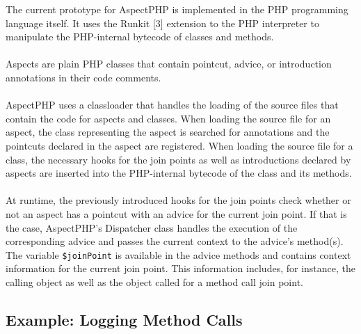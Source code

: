 \documentclass[portrait,a0]{a0poster}
\begin{document}
\begin{poster}
\begin{pcolumn}
\begin{pbox}
      The current prototype for AspectPHP is implemented in the PHP programming
      language itself. It uses the Runkit [3] extension to the PHP interpreter to
      manipulate the PHP-internal bytecode of classes and methods.\\
      \\
      Aspects are plain PHP classes that contain pointcut, advice, or
      introduction annotations in their code comments.\\
      \\
      AspectPHP uses a classloader that handles the loading of the source
      files that contain the code for aspects and classes.
      When loading the source file for an aspect, the class representing the
      aspect is searched for annotations and the pointcuts declared in the
      aspect are registered.
      When loading the source file for a class, the necessary hooks for the
      join points as well as introductions declared by aspects are inserted
      into the PHP-internal bytecode of the class and its methods.\\
      \\
      At runtime, the previously introduced hooks for the join points check
      whether or not an aspect has a pointcut with an advice for the current
      join point. If that is the case, AspectPHP's Dispatcher class handles
      the execution of the corresponding advice and passes the current context
      to the advice's method(s).\\
      The variable \lstinline{$joinPoint} is available in the advice methods and
      contains context information for the current join point. This information
      includes, for instance, the calling object as well as the object called for
      a method call join point.

\end{pbox}

\end{pcolumn}
\begin{pcolumn}

\begin{pbox}
\section{Example: Logging Method Calls}


\end{pbox}
\end{pcolumn}
\end{poster}
\end{document}
